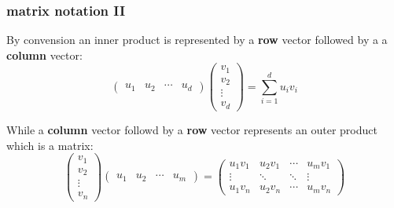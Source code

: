 \documentclass[smaller,handout]{beamer}
\def\darkred{\color{red!70!black}}
\def\vone{{\vskip.1in}}
\begin{document}
\begin{frame}
\frametitle{matrix notation II}

\pause \vone
By convension an {\darkred inner} product is represented by a {\bf row} vector
followed by a a {\bf column} vector:
$$
\begin{pmatrix} u_1 & u_2 &\cdots& u_d \end{pmatrix} \begin{pmatrix} v_1
  \\ v_2 \\ \vdots \\
  v_d \end{pmatrix} = \sum_{i=1}^d u_i v_i
$$

\pause \vone
While a {\bf column} vector followd by a {\bf row} vector represents
an {\darkred outer} product which is a matrix: 
$$ 
\begin{pmatrix} v_1  \\ v_2 \\ \vdots \\  v_n \end{pmatrix} 
\begin{pmatrix} u_1 & u_2 &\cdots& u_m \end{pmatrix}  =
\begin{pmatrix}
u_1 v_1 & u_2 v_1 & \cdots & u_m v_1 \\
\vdots & \ddots & \ddots & \vdots \\
u_1 v_n & u_2 v_n & \cdots & u_m v_n
\end{pmatrix}
$$


\end{frame}
\end{document}

